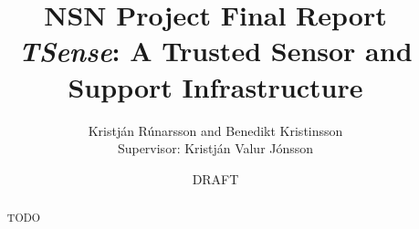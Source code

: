 \documentclass[10pt,a4paper]{report}
\author{Kristj\'{a}n R\'{u}narsson and Benedikt Kristinsson\\Supervisor: Kristj\'{a}n Valur J\'{o}nsson}
\title{NSN Project Final Report\\\textit{TSense}: A Trusted Sensor and Support Infrastructure}
\date{DRAFT}
\begin{document}
\maketitle

\tableofcontents

\begin{abstract}
TODO
\end{abstract}








\end{document}
